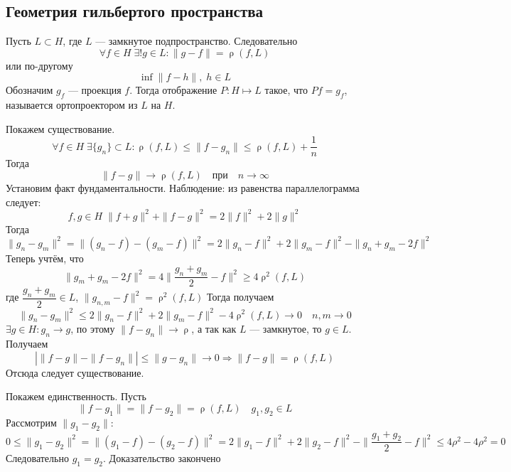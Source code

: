 \documentclass[14pt]{extarticle}
\DeclareMathOperator{\rh}{\rho}
\begin{document}
\subsection*{Геометрия гильбертого пространства}
\begin{Theor}
    Пусть $L \subset H$, где $L$ --- замкнутое подпространство.
    Следовательно
    $$
    \forall f \in H\; \exists! g \in L\colon \|g - f\| = \rh(f, L)
    $$ 
    или по-другому 
    $$
    \inf\|f - h\|, \;h\in L
    $$
    Обозначим $g_f$ --- проекция $f$.
    Тогда отображение $P:H \mapsto L$ такое, что $Pf = g_f$, называется ортопроектором из $L$ на $H$.
\end{Theor}
\begin{Proof}
    Покажем существование.
    $$
    \forall f \in H\;\exists \{g_n\} \subset L\colon \rh(f, L) \le \|f-g_n\| \le \rh(f,L) + \dfrac{1}{n}
    $$
    Тогда
    $$
    \|f - g\| \to \rh(f,L)\quad \text{при} \quad n \to \infty
    $$
    Установим факт фундаментальности.
    Наблюдение: из равенства параллелограмма следует:
    $$
    f, g\in H\;\|f + g\|^2 + \|f - g\|^2 = 2\|f\|^2 + 2\|g\|^2
    $$
    Тогда
    $$
    \|g_n - g_m\|^2 = \|(g_n - f) - (g_m - f)\|^2 = 2\|g_n - f\|^2 + 2\|g_m - f\|^2 - \|g_n + g_m - 2f\|^2
    $$
    Теперь учтём, что
    $$
    \|g_m+g_m-2f\|^2 = 4\|\dfrac{g_n + g_m}{2} - f\|^2 \ge 4\rh^2(f, L)
    $$
    где $\dfrac{g_n + g_m}{2} \in L$, $\|g_{n,m} - f\|^2 = \rh^2(f, L)$
    Тогда получаем
    $$
    \|g_n - g_m\|^2 \le 2\|g_n - f\|^2 + 2\|g_m - f\|^2 - 4\rh^2(f,L) \to 0 \quad n,m \to 0
    $$
    $\exists g \in H\colon g_n \to g$, по этому $\|f - g_n\| \to \rh$, а так как $L$ --- замкнутое, то $g \in L$.
    Получаем 
    $$
    |\|f - g\| - \|f - g_n\|| \le \|g - g_n\| \to 0 \Rightarrow \|f-g\| = \rh(f,L)
    $$
    Отсюда следует существование.
    
    Покажем единственность.
    Пусть
    $$
    \|f - g_1\| = \|f - g_2\| = \rh(f, L)\quad g_1, g_2 \in L
    $$
    Рассмотрим $\|g_1 - g_2\|$:
    $$
    0 \le \|g_1 - g_2\|^2 = \|(g_1 - f) - (g_2 - f)\|^2 = 2\|g_1 - f\|^2 + 2\|g_2 - f\|^2 - \|\dfrac{g_1 + g_2}{2} - f\|^2 \le 4\rho^2 - 4\rho^2 = 0
    $$
    Следовательно $g_1 = g_2$.
    Доказательство закончено
\end{Proof}
\end{document}
